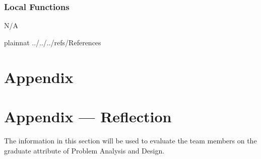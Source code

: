 \documentclass[12pt, titlepage]{article}
\begin{document}
\subsubsection{Local Functions}

N/A


\newpage

 {plainnat}
 {../../../refs/References}

\newpage

\section{Appendix} \label{Appendix}


\newpage{}

\section*{Appendix --- Reflection}


The information in this section will be used to evaluate the team members on the
graduate attribute of Problem Analysis and Design.


\end{document}
